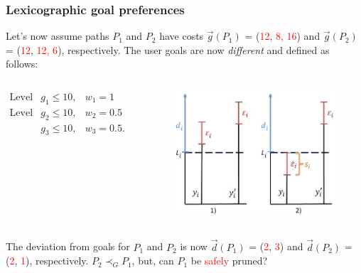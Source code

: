 \begin{frame}
\frametitle{Lexicographic goal preferences}
	\begin{example}
		Let's now assume paths $P_1$ and $P_2$ have costs $\vec g(P_1)$ = (\textcolor<2>{red}{12}, \textcolor<3>{red}{8, 16}) and $\vec g(P_2)$ = (\textcolor<2>{red}{12}, \textcolor<3>{red}{12, 6}), respectively. The user goals are now \emph{different} and defined as follows:
	\end{example}
	\vspace{-6mm}
	\begin{columns}[onlytextwidth, t]
	\vspace{3mm}
    \begin{equation*}
     \begin{array}{cll}
     	\textrm{Level 1:} & g_1 \leq 10, & w_1 = 1 \\
     	\textrm{Level 2:} & g_2 \leq 10, & w_2 = 0.5 \\ 
       	 				  & g_3 \leq 10, & w_3 = 0.5. \\
     \end{array}
   \end{equation*}	
    \begin{figure}
    \centering
    		\includegraphics[scale=0.25]{figs/cross-slacks}
  	\end{figure}
	\end{columns}     
   \begin{example}
		The deviation from goals for $P_1$ and $P_2$ is now $\vec d(P_1)$ = (\textcolor<2>{red}{2}, \textcolor<3>{red}{3}) and $\vec d(P_2)$ = (\textcolor<2>{red}{2}, \textcolor<3>{red}{1}), respectively. $P_2 \prec_G P_1$, but, can $P_1$ be \textcolor{red}{safely} pruned?
	\end{example}
\note{}
\end{frame}

